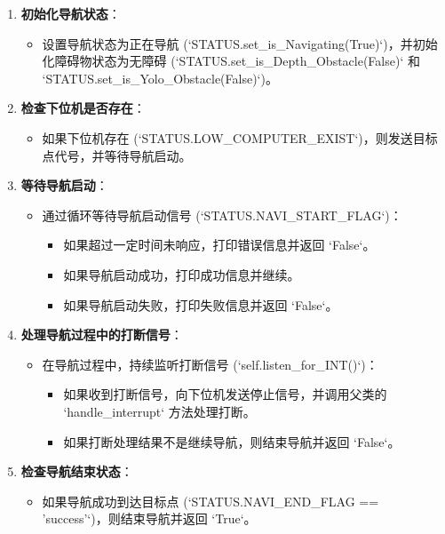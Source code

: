\documentclass[]{article}
\begin{document}
\begin{enumerate}
	\item \textbf{初始化导航状态}：
	\begin{itemize}
		\item 设置导航状态为正在导航 (`STATUS.set\_is\_Navigating(True)`)，并初始化障碍物状态为无障碍 (`STATUS.set\_is\_Depth\_Obstacle(False)` 和 `STATUS.set\_is\_Yolo\_Obstacle(False)`)。
	\end{itemize}
	
	\item \textbf{检查下位机是否存在}：
	\begin{itemize}
		\item 如果下位机存在 (`STATUS.LOW\_COMPUTER\_EXIST`)，则发送目标点代号，并等待导航启动。
	\end{itemize}
	
	\item \textbf{等待导航启动}：
	\begin{itemize}
		\item 通过循环等待导航启动信号 (`STATUS.NAVI\_START\_FLAG`)：
		\begin{itemize}
			\item 如果超过一定时间未响应，打印错误信息并返回 `False`。
			\item 如果导航启动成功，打印成功信息并继续。
			\item 如果导航启动失败，打印失败信息并返回 `False`。
		\end{itemize}
	\end{itemize}
	
	\item \textbf{处理导航过程中的打断信号}：
	\begin{itemize}
		\item 在导航过程中，持续监听打断信号 (`self.listen\_for\_INT()`)：
		\begin{itemize}
			\item 如果收到打断信号，向下位机发送停止信号，并调用父类的 `handle\_interrupt` 方法处理打断。
			\item 如果打断处理结果不是继续导航，则结束导航并返回 `False`。
		\end{itemize}
	\end{itemize}
	
	\item \textbf{检查导航结束状态}：
	\begin{itemize}
		\item 如果导航成功到达目标点 (`STATUS.NAVI\_END\_FLAG == 'success'`)，则结束导航并返回 `True`。
	\end{itemize}
	

\end{enumerate}
\end{document}
